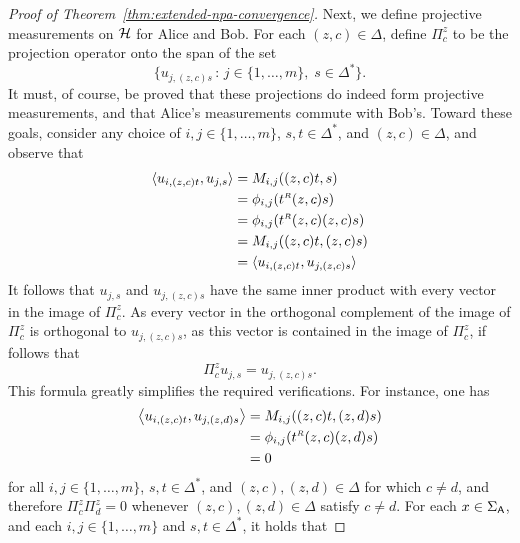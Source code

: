\begin{proof}[Proof of Theorem~\ref{thm:extended-npa-convergence}]
  Next, we define projective measurements on $\mathcal{H}$ for Alice and Bob.
  For each $(z,c)\in\Delta$, define $\Pi^z_c$ to be the projection operator
  onto the span of the set
  \begin{equation} \label{eq:enpa-projection-onto-span}
    \bigl\{u_{j,(z,c)s}\,:\,j\in\{1,\ldots,m\},\;s\in\Delta^{\ast}\bigr\}.
  \end{equation}
  It must, of course, be proved that these projections do indeed form projective
  measurements, and that Alice's measurements commute with Bob's.
  Toward these goals, consider any choice of $i,j \in \{1,\ldots,m\}$, $s,t \in \Delta^*$, and $(z,c) \in \Delta$, and observe that 
  \begin{equation}
	  \begin{aligned}
  	\ip{u_{i,(z,c)t}}{u_{j,s}} &= M_{i,j}((z,c)t,s) \\
  	&= \phi_{i,j}(t^{\mathsmaller{R}}(z,c)s) \\
  	&= \phi_{i,j}(t^{\mathsmaller{R}}(z,c)(z,c)s) \\
  	&= M_{i,j}((z,c)t,(z,c)s) \\
  	&= \ip{ u_{i,(z,c)t} }{ u_{j,(z,c)s} }
	  \end{aligned}
  \end{equation}
  It follows that $u_{j,s}$ and $u_{j,(z,c)s}$ have the same inner product with every vector in the image of $\Pi_c^z$. As every vector in the orthogonal complement of the image of $\Pi_c^z$ is orthogonal to $u_{j,(z,c)s}$, as this vector is contained in the image of $\Pi_c^z$, if follows that
  \begin{equation}
    \label{eq:projection-on-vectors}
    \Pi^z_c u_{j,s} = u_{j,(z,c)s}.
  \end{equation}
  This formula greatly simplifies the required verifications.
  For instance, one has
  \begin{equation}
  	\begin{aligned}
	    \bigip{u_{i,(z,c)t}}{u_{j,(z,d)s}} &= M_{i,j}((z,c)t,(z,d)s) \\
	    & = \phi_{i,j}(t^{\mathsmaller{R}}(z,c)(z,d)s) \\
	    & = 0
    \end{aligned}
  \end{equation}
  for all $i,j\in\{1,\ldots,m\}$, $s,t\in\Delta^{\ast}$, and
  $(z,c),(z,d)\in\Delta$ for which $c\not=d$, and therefore
  $\Pi^z_c \Pi^z_d = 0$
  whenever $(z,c),(z,d)\in\Delta$ satisfy $c\not=d$.
  For each $x\in \Sigma_{\mathsf{A}}$, and each $i,j\in\{1,\ldots,m\}$ and
  $s,t\in\Delta^{\ast}$, it holds that

\end{proof}
